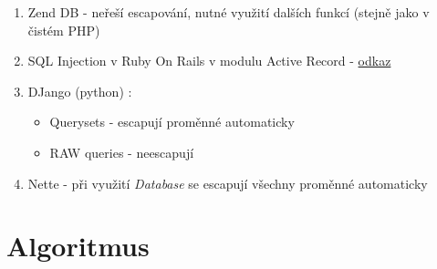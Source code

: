 \documentclass[12pt, a4paper]{report}
\begin{document}
\begin{enumerate}
\item Zend DB - neřeší escapování, nutné využití dalších funkcí (stejně jako v čistém PHP)
\item SQL Injection v Ruby On Rails v modulu Active Record - \href{https://groups.google.com/forum/?fromgroups=#!topic/rubyonrails-security/dUaiOOGWL1k}{odkaz}
\item DJango (python) :
\begin{itemize}
\item Querysets - escapují proměnné automaticky
\item RAW queries - neescapují
\end{itemize}
\item Nette - při využití \textit{Database} se escapují všechny proměnné automaticky
\end{enumerate}





\chapter{Algoritmus}
\end{document}
